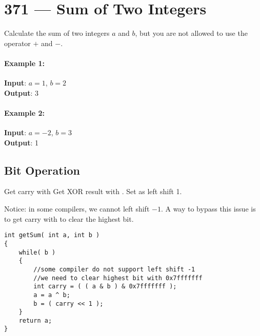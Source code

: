 \section{371 --- Sum of Two Integers}
Calculate the sum of two integers $ a $ and $ b $, but you are not allowed to use the operator $ + $ and $ - $.

\paragraph{Example 1:}

\begin{flushleft}
\textbf{Input}: $ a = 1 $, $ b = 2 $
\\
\textbf{Output}: 3
\end{flushleft}

\paragraph{Example 2:}

\begin{flushleft}
\textbf{Input}: $ a = -2 $, $ b = 3 $
\\
\textbf{Output}: 1
\end{flushleft}

\subsection{Bit Operation}
Get carry with 
Get XOR result with .
Set  as  left shift 1.

Notice: in some compilers, we cannot left shift $-1$. A way to bypass this issue is to get carry with  to clear the highest bit.

\setcounter{lstlisting}{0}
\begin{lstlisting}[style=customc, caption={Bit Operation}]
int getSum( int a, int b )
{
    while( b )
    {
        //some compiler do not support left shift -1
        //we need to clear highest bit with 0x7fffffff
        int carry = ( ( a & b ) & 0x7fffffff );
        a = a ^ b;
        b = ( carry << 1 );
    }
    return a;
}
\end{lstlisting}